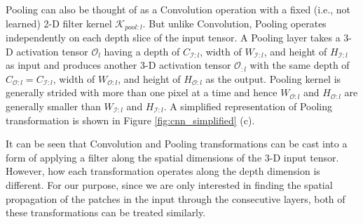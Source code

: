 Pooling can also be thought of as a Convolution operation with a fixed (i.e., not learned) 2-D filter kernel $\mathcal{K}_{pool:l}$.
But unlike Convolution, Pooling operates independently on each depth slice of the input tensor.
A Pooling layer takes a 3-D activation tensor $\mathcal{O}_{l}$ having a depth of $C_{\mathcal{I}:l}$, width of $W_{\mathcal{I}:l}$, and height of $H_{\mathcal{I}:l}$ as input and produces another 3-D activation tensor $\mathcal{O}_{:l}$ with the same depth of $C_{\mathcal{O}:l}=C_{\mathcal{I}:l}$, width of $W_{\mathcal{O}:l}$, and height of $H_{\mathcal{O}:l}$ as the output.
Pooling kernel is generally strided with more than one pixel at a time and hence $W_{\mathcal{O}:l}$ and $H_{\mathcal{O}:l}$ are generally smaller than $W_{\mathcal{I}:l}$ and $H_{\mathcal{I}:l}$.
A simplified representation of Pooling transformation is shown in Figure \ref{fig:cnn_simplified} (c).



It can be seen that Convolution and Pooling transformations can be cast into a form of applying a filter along the spatial dimensions of the 3-D input tensor.
However, how each transformation operates along the depth dimension is different.
For our purpose, since we are only interested in finding the spatial propagation of the patches in the input through the consecutive layers, both of these transformations can be treated similarly.

